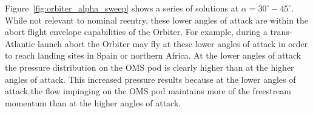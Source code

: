 \clearpage
Figure~\ref{fig:orbiter_alpha_sweep} shows a series of solutions at $\alpha=30^\circ-45^\circ$. While not relevant to nominal reentry, these lower angles of attack are within the abort flight envelope capabilities of the Orbiter. For example, during a trans-Atlantic launch abort the Orbiter may fly at these lower angles of attack in order to reach landing sites in Spain or northern Africa. At the lower angles of attack the pressure distribution on the OMS pod is clearly higher than at the higher angles of attack.  This increased pressure results because at the lower angles of attack the flow impinging on the OMS pod maintains more of the freestream momentum than at the higher angles of attack.  
